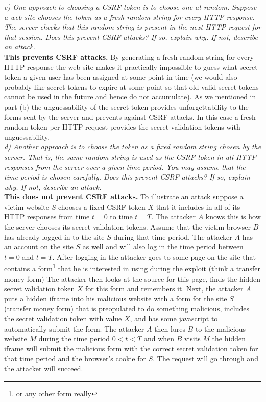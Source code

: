 \noindent \textit{c) One approach to choosing a CSRF token is to choose one at random. Suppose a web site chooses the token as a fresh random string for every HTTP response. The server checks that this random string is present in the next HTTP request for that session. Does this prevent CSRF attacks? If so, explain why. If not, describe an attack.}\\

\textbf{This prevents CSRF attacks. } By generating a fresh random string for every HTTP response the web site makes it practically impossible to guess what secret token a given user has been assigned at some point in time (we would also probably like secret tokens to expire at some point so that old valid secret tokens cannot be used in the future and hence do not accumulate). As we mentioned in part (b) the unguessability of the secret token provides unforgettability to the forms sent by the server and prevents against CSRF attacks. In this case a fresh random token per HTTP request provides the secret validation tokens with unguessability.\\

\noindent \textit{d) Another approach is to choose the token as a fixed random string chosen by the server. That is, the same random string is used as the CSRF token in all HTTP responses from the server over a given time period. You may assume that the time period is chosen carefully. Does this prevent CSRF attacks? If so, explain why. If not, describe an attack.}\\


\textbf{This does not prevent CSRF attacks. } To illustrate an attack suppose a victim website $S$ chooses a fixed CSRF token $X$ that it includes in all of its HTTP responses from time $t=0$ to time $t=T$. The attacker $A$ knows this is how the server chooses its secret validation tokens. Assume that the victim browser $B$ has already logged in to the site $S$ during that time period. The attacker $A$ has an account on the site $S$ as well and will also log in the time period between $t=0$ and $t=T$. After logging in the attacker goes to some page on the site that contains a form\footnote{or any other form really} that he is interested in using during the exploit (think a transfer money form) The attacker then looks at the source for this page, finds the hidden secret validation token $X$ for this form and remembers it. Next, the attacker $A$ puts a hidden iframe into his malicious website with a form for the site $S$ (transfer money form) that is preopulated to do something malicious, includes the secret validation token with value $X$, and has some javascript to automatically submit the form. The attacker $A$ then lures $B$ to the malicious website $M$ during the time period $0<t<T$ and when $B$ visits $M$ the hidden iframe will submit the malicious form with the correct secret validation token for that time period and the browser's cookie for $S$. The request will go through and the attacker will succeed.\\

